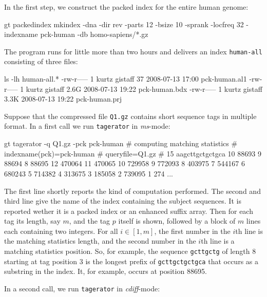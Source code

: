 \documentclass[12pt]{article}
\newcommand{\Program}[0]{\texttt{tagerator}\xspace}
\begin{document}
In the first step, we construct the packed index for the entire human genome:

\begin{Output}
gt packedindex mkindex -dna -dir rev -parts 12 -bsize 10 -sprank -locfreq 32
                       -indexname pck-human -db homo-sapiens/*.gz
\end{Output}

The program runs for little more than two hours and delivers 
an index \texttt{human-all} consisting of three files:

\begin{Output}
ls -lh human-all.*
-rw-r----- 1 kurtz gistaff   37 2008-07-13 17:00 pck-human.al1
-rw-r----- 1 kurtz gistaff 2.6G 2008-07-13 19:22 pck-human.bdx
-rw-r----- 1 kurtz gistaff 3.3K 2008-07-13 19:22 pck-human.prj
\end{Output}

Suppose that the compressed file \texttt{Q1.gz} contains short sequence tags
in multiple \Fasta format. In a first call we run \Program in \textit{ms}-mode:

\begin{Output}
gt tagerator -q Q1.gz -pck pck-human
# computing matching statistics
# indexname(pck)=pck-human
# queryfile=Q1.gz
# 15 aagcttgctgctgca
10 88693
9 88694
8 88695
12 470064
11 470065
10 729958
9 772093
8 403975
7 544167
6 680243
5 714382
4 313675
3 185058
2 739095
1 274
...
\end{Output}
The first line shortly reports the kind of computation performed. The second
and third line give the name of the index containing the subject sequences.
It is reported wether it is a packed index or an enhanced suffix array. Then for
each tag its length, say \(m\), and the tag \(p\) itself is shown, followed by 
a block of \(m\) lines each containing two integers. For all \(i\in[1,m]\), 
the first number in the \(i\)th line is the matching statistics length,
and the second number in the \(i\)th line is a matching statistics position.
So, for example, the sequence \texttt{gcttgctg} of length 8 starting at tag
position 3 is the longest prefix of \texttt{gcttgctgctgca} that occurs as 
a substring in the index. It, for example, occurs at position 88695.

In a second call, we run \Program in \textit{cdiff}-mode:
\end{document}
